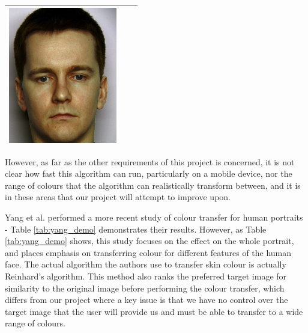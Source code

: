 \begin{table}[H]
\begin{tabular}{|c|c|c|}
\begin{minipage}{.29\textwidth}
    \includegraphics[width=\textwidth,height=\textheight,keepaspectratio]{images/seo_result1}
  \end{minipage} \\
    \hline
\end{tabular}
\end{table}

However, as far as the other requirements of this project is concerned, it is not clear how fast this algorithm can run, particularly on a mobile device, nor the range of colours that the algorithm can realistically transform between, and it is in these areas that our project will attempt to improve upon.

Yang et al. performed a more recent study of colour transfer for human portraits \cite{yang_2017_semantic} - Table \ref{tab:yang_demo} demonstrates their results. However, as Table \ref{tab:yang_demo} shows, this study focuses on the effect on the whole portrait, and places emphasis on transferring colour for different features of the human face. The actual algorithm the authors use to transfer skin colour is actually Reinhard's algorithm. This method also ranks the preferred target image for similarity to the original image before performing the colour transfer, which differs from our project where a key issue is that we have no control over the target image that the user will provide us and must be able to transfer to a wide range of colours. 

